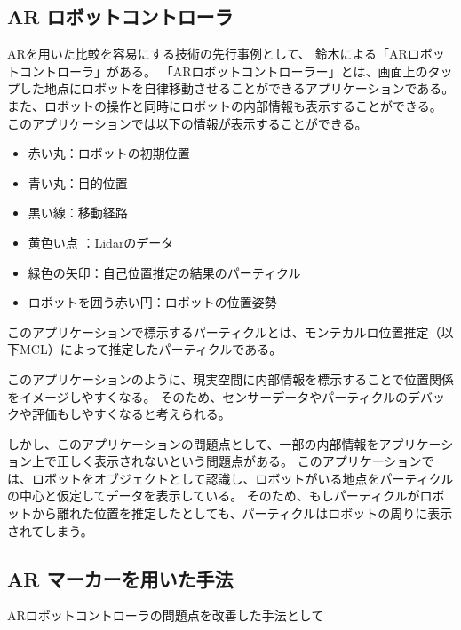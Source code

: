 \subsection{AR ロボットコントローラ}
ARを用いた比較を容易にする技術の先行事例として、
鈴木による「ARロボットコントローラ」\cite{鈴木勇矢2019ARロボットコントローラ}がある。
「ARロボットコントローラー」とは、画面上のタップした地点にロボットを自律移動させることができるアプリケーションである。
また、ロボットの操作と同時にロボットの内部情報も表示することができる。
このアプリケーションでは以下の情報が表示することができる。
\begin{itemize}
      \item 赤い丸：ロボットの初期位置
      \item 青い丸：目的位置
      \item 黒い線：移動経路
      \item 黄色い点 ：Lidarのデータ
      \item 緑色の矢印：自己位置推定の結果のパーティクル
　　　\item ロボットを囲う赤い円：ロボットの位置姿勢
\end{itemize}
このアプリケーションで標示するパーティクルとは、モンテカルロ位置推定（以下MCL）によって推定したパーティクルである。


このアプリケーションのように、現実空間に内部情報を標示することで位置関係をイメージしやすくなる。
そのため、センサーデータやパーティクルのデバックや評価もしやすくなると考えられる。

しかし、このアプリケーションの問題点として、一部の内部情報をアプリケーション上で正しく表示されないという問題点がある。
このアプリケーションでは、ロボットをオブジェクトとして認識し、ロボットがいる地点をパーティクルの中心と仮定してデータを表示している。
そのため、もしパーティクルがロボットから離れた位置を推定したとしても、パーティクルはロボットの周りに表示されてしまう。


\subsection{AR マーカーを用いた手法}
ARロボットコントローラの問題点を改善した手法として\cite{高原21}

%

